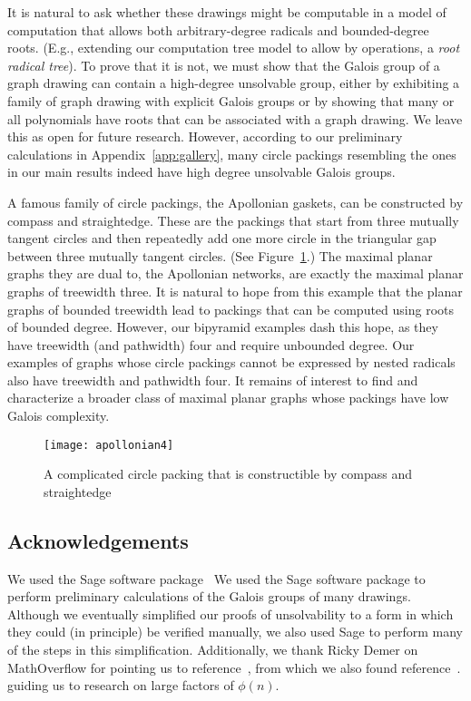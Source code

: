 \documentclass[oribibl,10pt]{llncs}
\begin{document}
It is natural to ask whether these drawings might be computable in a model of computation that allows both arbitrary-degree radicals and bounded-degree roots.
\ifFull
(E.g., extending our computation tree model to allow by operations, a \emph{root radical tree}).
To prove that it is not, we must show that the Galois group of a graph drawing can contain a high-degree unsolvable group, either by exhibiting a family of graph drawing with explicit Galois groups
or by showing that many or all polynomials have roots that can be associated with a graph drawing. 
\fi
We leave this as open for future research.
\ifFull
However, according to our preliminary calculations in Appendix~\ref{app:gallery}, many circle packings resembling the ones in our main results indeed have high degree unsolvable Galois groups.

A famous family of circle packings, the Apollonian gaskets, can be constructed by compass and straightedge. 
These are the packings that start from three mutually tangent circles and then repeatedly add one more circle in the triangular gap between three mutually tangent circles.
(See Figure~\ref{fig:apollonian4}.) 
The maximal planar graphs they are dual to, the Apollonian networks, are exactly the maximal planar graphs of treewidth three. It is natural to hope from this example that the planar graphs of bounded treewidth lead to packings that can be computed using roots of bounded degree. However, our bipyramid examples dash this hope, as they have treewidth (and pathwidth) four and require unbounded degree. Our examples of graphs whose circle packings cannot be expressed by nested radicals also have treewidth and pathwidth four. It remains of interest to find and characterize a broader class of maximal planar graphs whose packings have low Galois complexity.

\begin{figure}[hbt]
\centering\texttt{[image: apollonian4]}
\caption{A complicated circle packing that is constructible by compass and straightedge}
\label{fig:apollonian4}
\end{figure}
\fi

\subsection*{Acknowledgements}

\ifFull
We used the Sage software package~\cite{Sage}
\else
We used the Sage software package
\fi
to perform preliminary calculations of the Galois groups of many drawings. 
\ifFull
Although we eventually simplified our proofs of unsolvability to a form in which they could (in principle) be verified manually, we also used Sage to perform many of the steps in this simplification.
\fi
Additionally, we thank Ricky Demer on MathOverflow for
\ifFull
pointing us to reference~\cite{Har-MC-05}, from which we also found reference~\cite{BakHar-AA-98}.
\else
guiding us to research on large factors of $\phi(n)$.
\fi
\end{document}

